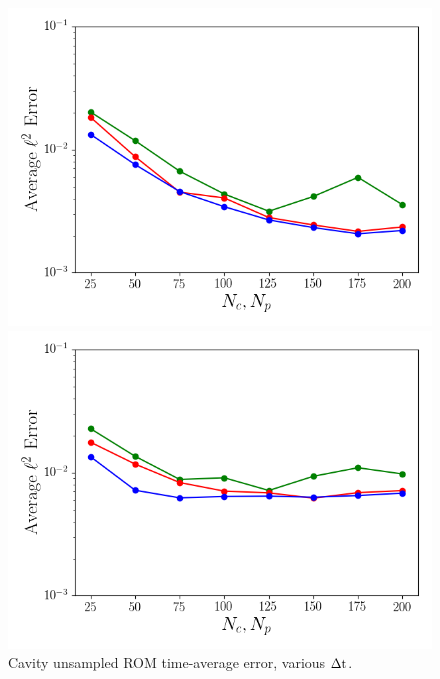 \begin{figure}
	\begin{minipage}{0.49\linewidth}
		\includegraphics[width=0.99\linewidth]{Chapters/CavityAndCVRC/Images/cavity/unsampled/unsampled_dt5e-6_Average_errorRaw.png}
		\subcaption{\label{fig:cavityUnsampledROMErrVsModesDt5en6}$\dt = 5 \times \dtFOM$}
	\end{minipage}
	\begin{minipage}{0.49\linewidth}
		\includegraphics[width=0.99\linewidth]{Chapters/CavityAndCVRC/Images/cavity/unsampled/unsampled_dt1e-5_Average_errorRaw.png}
		\subcaption{$\dt = 10 \times \dtFOM$}
	\end{minipage}
	\caption{\label{fig:cavityUnsampledROMErrVsModes}Cavity unsampled ROM time-average error, various $\Delta \text{t}$.}
\end{figure}

